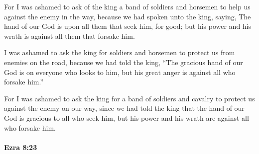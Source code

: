 			\begin{versebox}
					\item[BHS] 
					\item[LXX] 
					\item[ASV] For I was ashamed to ask of the king a band of soldiers and horsemen to help us against the enemy in the way, because we had spoken unto the king, saying, The hand of our God is upon all them that seek him, for good; but his power and his wrath is against all them that forsake him.
					\item[NIV] I was ashamed to ask the king for soldiers and horsemen to protect us from enemies on the road, because we had told the king, “The gracious hand of our God is on everyone who looks to him, but his great anger is against all who forsake him.”
					\item[NRSV] For I was ashamed to ask the king for a band of soldiers and cavalry to protect us against the enemy on our way, since we had told the king that the hand of our God is gracious to all who seek him, but his power and his wrath are against all who forsake him.
			\end{versebox}

		\paragraph{Ezra 8:23} %
			\label{EZRA-8-23}

